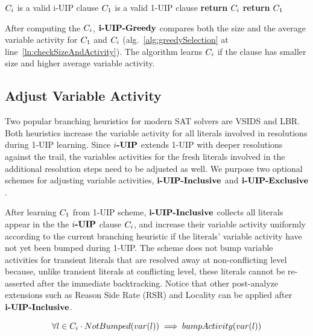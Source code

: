 \documentclass[runningheads]{llncs}
\begin{document}
\begin{algorithm}[t]
\caption{$\IUIPGreedy$}\label{alg:greedySelection}
\begin{algorithmic}[1]
\Require  $C_{i}$ is a valid i-UIP clause
\Require  $C_{1}$ is a valid 1-UIP clause
\Procedure{$\IUIPGreedy$}{$\iUIPClause, \oneUIPClause$} 
    \label{ln:checkSizeAndActivity}
    \State \textbf{return} $C_{i}$
\Else
    \State \textbf{return} $C_{1}$
\EndIf  \label{ln:cSizeCheck}
\EndProcedure
\end{algorithmic}
\end{algorithm}

After computing the $C_{i}$, $\IUIPGreedy$ compares both the
size and the average variable activity for $C_{1}$ and
$C_{i}$ (alg.~\ref{alg:greedySelection} at
line~\ref{ln:checkSizeAndActivity}). The algorithm learns
$C_{i}$ if the clause has smaller size and higher average
variable activity.

\subsection{Adjust Variable Activity} \label{sec: varajust} Two
popular branching heuristics for modern SAT solvers are VSIDS and
LBR. Both heuristics increase the variable activity for all literals
involved in resolutions during 1-UIP learning. Since $\textbf{$i$-UIP}$ extends
1-UIP with deeper resolutions against the trail, the variables
activities for the fresh literals involved in the additional
resolution steps need to be adjusted as well. We purpose two optional
schemes for adjusting variable activities, $\textbf{i-UIP-Inclusive}$ and
$\textbf{i-UIP-Exclusive}$.

After learning $C_{1}$ from 1-UIP scheme, $\textbf{i-UIP-Inclusive}$
collects all literals appear in the the $\textbf{$i$-UIP}$ clause $C_{i}$,
and increase their variable activity uniformly according to the
current branching heuristic if the literals' variable activity have
not yet been bumped during 1-UIP. The scheme does not bump variable
activities for transient literals that are resolved away at
non-conflicting level because, unlike transient literals at
conflicting level, these literals cannot be re-asserted after the
immediate backtracking. Notice that other post-analyze extensions such
as Reason Side Rate (RSR) and Locality\cite{} can be applied after
$\textbf{i-UIP-Inclusive}$.

\[ \forall l \in  C_{i} \cdot NotBumped(var(l)) \implies  bumpActivity(var(l)) \]
\end{document}
